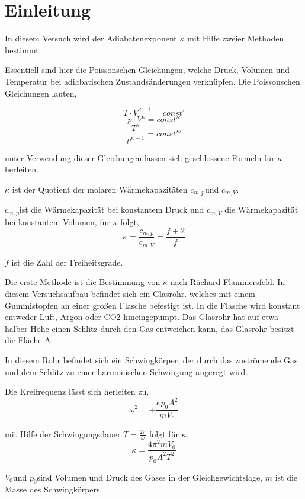 \section{Einleitung}

In diesem Versuch wird der Adiabatenexponent $\kappa$ mit Hilfe zweier
Methoden bestimmt.

Essentiell sind hier die Poissonschen Gleichungen, welche Druck, Volumen
und Temperatur bei adiabatischen Zustandsänderungen verknüpfen. Die
Poissonschen Gleichungen lauten,

\[
T\cdot V^{\kappa-1}=const'
\]
\begin{equation}
p\cdot V^{\kappa}=const''\label{eq:Poisson}
\end{equation}
\[
\frac{T^{\kappa}}{p^{\kappa-1}}=const'''
\]


unter Verwendung dieser Gleichungen lassen sich geschlossene Formeln
für $\kappa$ herleiten.

$\kappa$ ist der Quotient der molaren Wärmekapazitäten $c_{m,p}$und
$c_{m,V}$.

$c_{m,p}$ist die Wärmekapazität bei konstantem Druck und $c_{m,V}$
die Wärmekapazität bei konstantem Volumen, für $\kappa$ folgt,
\[
\kappa=\frac{c_{m,p}}{c_{m,V}}=\frac{f+2}{f}
\]


$f$ ist die Zahl der Freiheitsgrade.

Die erste Methode ist die Bestimmung von $\kappa$ nach Rüchard-Flammersfeld.
In diesem Versuchsaufbau befindet sich ein Glasrohr. welches mit einem
Gummistopfen an einer großen Flasche befestigt ist. In die Flasche
wird konstant entweder Luft, Argon oder CO2 hineingepumpt. Das Glasrohr
hat auf etwa halber Höhe einen Schlitz durch den Gas entweichen kann,
das Glasrohr besitzt die Fläche A.

In diesem Rohr befindet sich ein Schwingkörper, der durch das zuströmende
Gas und dem Schlitz zu einer harmonischen Schwingung angeregt wird.

Die Kreifrequenz lässt sich herleiten zu,
\begin{equation}
\omega^{2}=+\frac{\kappa p_{0}A^{2}}{mV_{0}}\label{eq:Frequenz}
\end{equation}


mit Hilfe der Schwingungsdauer $T=\frac{2\pi}{\omega}$ folgt für
$\kappa$,
\begin{equation}
\kappa=\frac{4\pi^{2}mV_{0}}{p_{0}A^{2}T^{2}}\label{eq:adiabatenexponent}
\end{equation}


$V_{0}$und $p_{0}$sind Volumen und Druck des Gases in der Gleichgewichtslage,
$m$ ist die Masse des Schwingkörpers.


